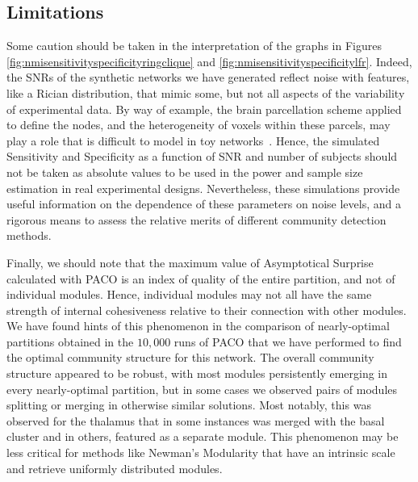 \subsection{Limitations}
Some caution should be taken in the interpretation of the graphs in Figures \ref{fig:nmisensitivityspecificityringclique} and \ref{fig:nmisensitivityspecificitylfr}.
Indeed, the SNRs of the synthetic networks we have generated reflect noise with features, like a Rician distribution, that mimic some, but not all aspects of the variability of experimental data.
By way of example, the brain parcellation scheme applied to define the nodes, and the heterogeneity of voxels within these parcels, may play a role that is difficult to model in toy networks~\cite{fornito2010}.
Hence, the simulated Sensitivity and Specificity as a function of SNR and number of subjects should not be taken as absolute values to be used in the power and sample size estimation in real experimental designs.
Nevertheless, these simulations provide useful information on the dependence of these parameters on noise levels, and a rigorous means to assess the relative merits of different community detection methods.

 Finally, we should note that the maximum value of Asymptotical Surprise calculated with PACO is an index of quality of the entire partition, and not of individual modules.
Hence, individual modules may not all have the same strength of internal cohesiveness relative to their connection with other modules. We have found hints of this phenomenon in the comparison of nearly-optimal partitions obtained in the $10,000$ runs of PACO that we have performed to find the optimal community structure for this network.
The overall community structure appeared to be robust, with most modules persistently emerging in every nearly-optimal partition, but in some cases we observed pairs of modules splitting or merging in otherwise similar solutions. Most notably, this was observed for the thalamus that in some instances was merged with the basal cluster and in others, featured as a separate module.
This phenomenon may be less critical for methods like Newman's Modularity that have an intrinsic scale and retrieve uniformly distributed modules.

